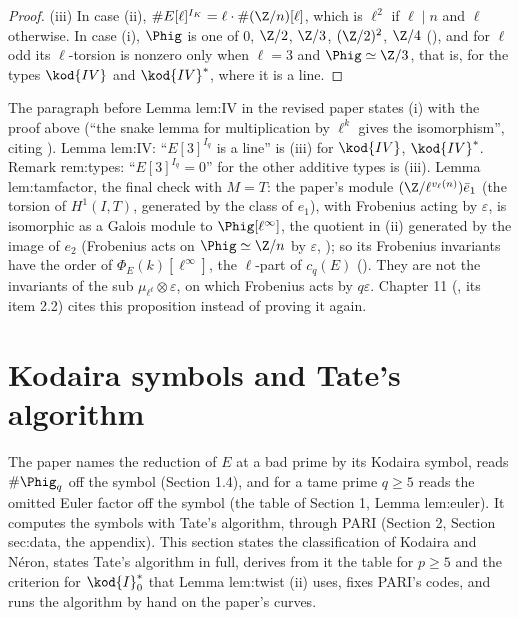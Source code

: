 \begin{proof}
(iii) In case (ii), $\#E[\ell]^{I_K}=\ell\cdot\#(\Z/n)[\ell]$, which is $\ell^2$ if $\ell\mid n$ and $\ell$ otherwise. In case
(i), $\Phig$ is one of $0$, $\Z/2$, $\Z/3$, $(\Z/2)^2$, $\Z/4$ (), and for $\ell$ odd its
$\ell$-torsion is nonzero only when $\ell=3$ and $\Phig\simeq\Z/3$, that is, for the types $\kod{IV}$ and $\kod{IV}^*$, where
it is a line.
\end{proof}

\begin{paperlink}
The paragraph before Lemma lem:IV in the revised paper states (i) with the proof above (``the snake lemma for
multiplication by $\ell^k$ gives the isomorphism'', citing \cite[Section 1]{SerreTate68}). Lemma lem:IV: ``$E[3]^{I_q}$
is a line'' is (iii) for $\kod{IV}$, $\kod{IV}^*$. Remark rem:types: ``$E[3]^{I_q}=0$'' for the other additive types is
(iii). Lemma lem:tamfactor, the final check with $M=T$: the paper's module $(\Z/\ell^{v_\ell(n)})\bar e_1$ (the torsion of
$H^1(I,T)$, generated by the class of $e_1$), with Frobenius acting by $\varepsilon$, is isomorphic as a Galois module to
$\Phig[\ell^\infty]$, the quotient in (ii) generated by the image of $e_2$ (Frobenius acts on $\Phig\simeq\Z/n$ by $\varepsilon$,
); so its Frobenius invariants have the order of $\Phi_E(k)[\ell^\infty]$, the $\ell$-part of
$c_q(E)$ (). They are not the invariants of the sub $\mu_{\ell^t}\otimes\varepsilon$, on which
Frobenius acts by $q\varepsilon$. Chapter 11 (, its item 2.2) cites this proposition instead of
proving it again.
\end{paperlink}

\section{Kodaira symbols and Tate's algorithm}\label{sec:reduction:kodaira}

The paper names the reduction of $E$ at a bad prime by its Kodaira symbol, reads $\#\Phig_q$ off the symbol
(Section 1.4), and for a tame prime $q\ge5$ reads the omitted Euler factor off the symbol (the table of Section 1,
Lemma lem:euler). It computes the symbols with Tate's algorithm, through PARI (Section 2, Section sec:data, the
appendix). This section states the classification of Kodaira and N\'eron, states Tate's algorithm in full, derives
from it the table for $p\ge5$ and the criterion for $\kod{I}_0^*$ that Lemma lem:twist (ii) uses, fixes PARI's codes,
and runs the algorithm by hand on the paper's curves.

